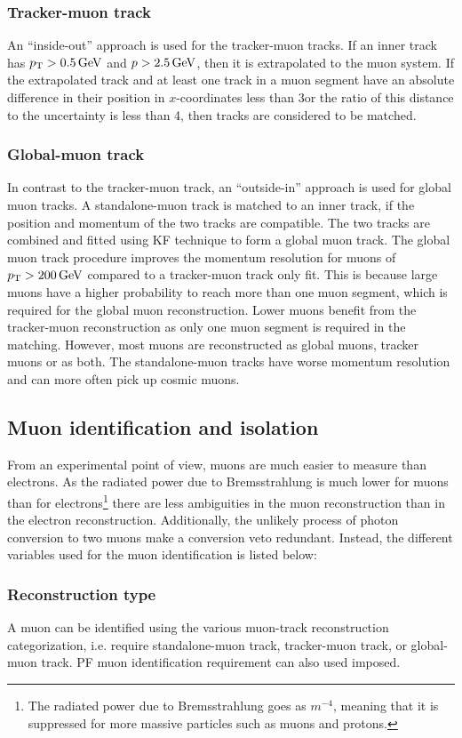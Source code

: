 \subsubsection*{Tracker-muon track}
\noindent\justify
An ``inside-out'' approach is used for the tracker-muon tracks. 
If an inner track has $p_{\mathrm{T}} > 0.5\,\text{Ge\hspace{-.08em}V}$ and $p > 2.5\,\text{Ge\hspace{-.08em}V}$, then it is extrapolated to the muon system. 
If the extrapolated track and at least one track in a muon segment have an absolute difference in their position in $x$-coordinates less than 3\cm or the ratio of this distance to the uncertainty is less than 4, then tracks are considered to be matched.  
\subsubsection*{Global-muon track}
\noindent\justify
In contrast to the tracker-muon track, an ``outside-in'' approach is used for global muon tracks. 
A standalone-muon track is matched to an inner track, if the position and momentum of the two tracks are compatible. 
The two tracks are combined and fitted using KF technique to form a global muon track. 
The global muon track procedure improves the momentum resolution for muons of $p_{\mathrm{T}} > 200\,\text{Ge\hspace{-.08em}V}$ compared to a tracker-muon track only fit. 
This is because large \pt muons have a higher probability to reach more than one muon segment, which is required for the global muon reconstruction. 
Lower \pt muons benefit from the tracker-muon reconstruction as only one muon segment is required in the matching. 
However, most muons are reconstructed as global muons, tracker muons or as both. The standalone-muon tracks have worse momentum resolution and can more often pick up cosmic muons. 
\subsection*{Muon identification and isolation}
\noindent\justify
From an experimental point of view, muons are much easier to measure than electrons. 
As the radiated power due to Bremsstrahlung is much lower for muons than for electrons\footnote{The radiated power due to Bremsstrahlung goes as $m^{-4}$, meaning that it is suppressed for more massive particles such as muons and protons.} there are less ambiguities in the muon reconstruction than in the electron reconstruction. 
Additionally, the unlikely process of photon conversion to two muons make a conversion veto redundant.   
Instead, the different variables used for the muon identification is listed below:
\subsubsection*{Reconstruction type}
\noindent\justify
 A muon can be identified using the various muon-track reconstruction categorization, i.e. require standalone-muon track, tracker-muon track, or global-muon track. 
PF muon identification requirement can also used imposed.
